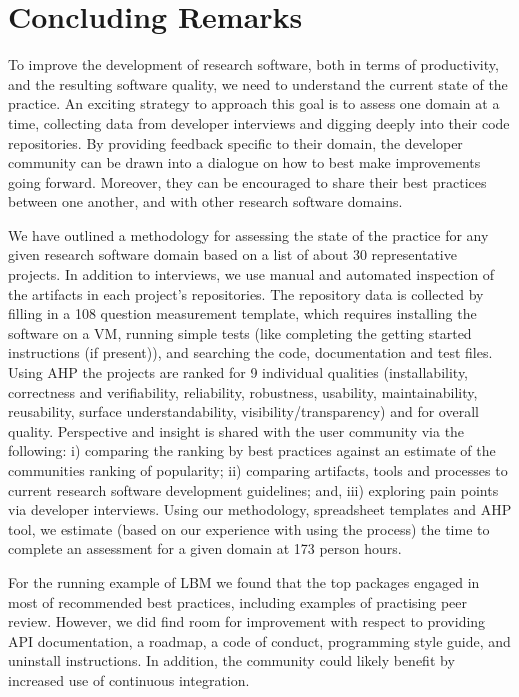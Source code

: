 \documentclass[runningheads]{llncs}
\begin{document}
\section{Concluding Remarks} \label{SecConcludingRemarks}

To improve the development of research software, both in terms of productivity,
and the resulting software quality, we need to understand the current state of
the practice. An exciting strategy to approach this goal is to assess one domain
at a time, collecting data from developer interviews and digging deeply into
their code repositories. By providing feedback specific to their domain, the
developer community can be drawn into a dialogue on how to best make
improvements going forward. Moreover, they can be encouraged to share their best
practices between one another, and with other research software domains.

We have outlined a methodology for assessing the state of the practice for any
given research software domain based on a list of about 30 representative
projects.  In addition to interviews, we use manual and automated inspection of
the artifacts in each project's repositories.  The repository data is collected
by filling in a 108 question measurement template, which requires installing the
software on a VM, running simple tests (like completing the getting started
instructions (if present)), and searching the code, documentation and test
files. Using AHP the projects are ranked for 9 individual qualities
(installability, correctness and verifiability, reliability, robustness,
usability, maintainability, reusability, surface understandability,
visibility/transparency) and for overall quality.  Perspective and insight is
shared with the user community via the following: i) comparing the ranking by
best practices against an estimate of the communities ranking of popularity; ii)
comparing artifacts, tools and processes to current research software
development guidelines; and, iii) exploring pain points via developer
interviews. Using our methodology, spreadsheet templates and AHP tool, we
estimate (based on our experience with using the process) the time to complete
an assessment for a given domain at 173 person hours.

For the running example of LBM we found that the top packages engaged in most of
recommended best practices, including examples of practising peer review.
However, we did find room for improvement with respect to providing API
documentation, a roadmap, a code of conduct, programming style guide, and
uninstall instructions.  In addition, the community could likely benefit by
increased use of continuous integration.
\end{document}
